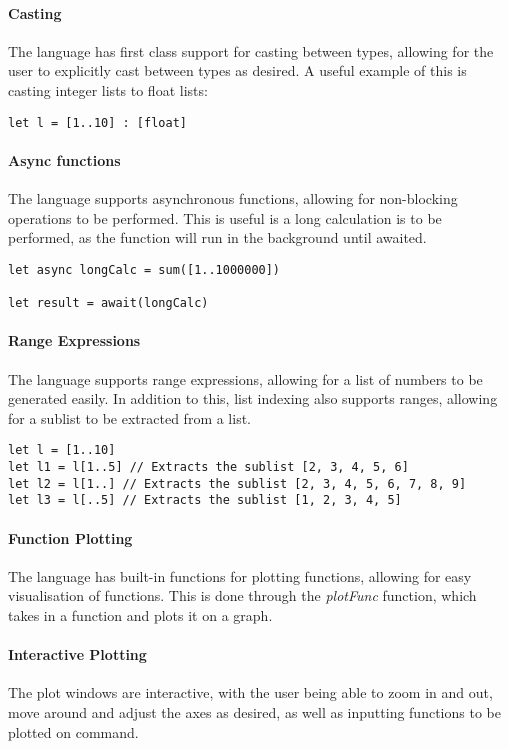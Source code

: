 \paragraph{Casting} The language has first class support for casting between types, allowing for the user to
explicitly cast between types as desired.
A useful example of this is casting integer lists to float lists:

\begin{verbatim}
let l = [1..10] : [float]
\end{verbatim}

\paragraph{Async functions} The language supports asynchronous functions, allowing for non-blocking operations
to be performed.
This is useful is a long calculation is to be performed, as the function will run in the background until awaited.

\begin{verbatim}
let async longCalc = sum([1..1000000])

let result = await(longCalc)
\end{verbatim}

\paragraph{Range Expressions} The language supports range expressions, allowing for a list of numbers to be
generated easily.
In addition to this, list indexing also supports ranges, allowing for a sublist to be extracted from a list.

\begin{verbatim}
let l = [1..10]
let l1 = l[1..5] // Extracts the sublist [2, 3, 4, 5, 6]
let l2 = l[1..] // Extracts the sublist [2, 3, 4, 5, 6, 7, 8, 9]
let l3 = l[..5] // Extracts the sublist [1, 2, 3, 4, 5]
\end{verbatim}

\paragraph{Function Plotting} The language has built-in functions for plotting functions, allowing for easy
visualisation of functions.
This is done through the \textit{plotFunc} function, which takes in a function and plots it on a graph.

\paragraph{Interactive Plotting} The plot windows are interactive, with the user being able to zoom in and out,
move around and adjust the axes as desired, as well as inputting functions to be plotted on command.